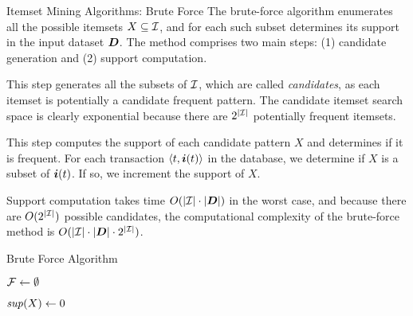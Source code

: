 \begin{frame}{Itemset Mining Algorithms: Brute Force}
\small
The brute-force
algorithm enumerates all the
possible itemsets $X \subseteq {\mathcal I}$, and for each such subset determines
its support in the input dataset ${\boldsymbol D}$. The method comprises two main
steps: (1) candidate generation and (2) support
computation.

This step generates all the subsets of
${\mathcal I}$, which are called {\em candidates}, as each itemset is
potentially a candidate frequent pattern. The candidate itemset search
space is clearly exponential because there are $2^{|{\mathcal I}|}$
potentially frequent itemsets.   


This step computes the support of each
candidate pattern $X$ and determines if it is frequent.
For each transaction
$\langle t, {{\boldsymbol i}}(t) \rangle$ in the database, we determine if $X$ is a
subset of ${{\boldsymbol i}}(t)$. If so, we increment the support of $X$.


Support computation takes time $O(|{\mathcal I}| \cdot | {\boldsymbol D} |)$ in the worst
case, and because there are $O(2^{|{\mathcal I}|})$ possible candidates,
the computational complexity of the brute-force method is
$O(|{\mathcal I}|\cdot|{\boldsymbol D}|\cdot2^{|{\mathcal I}|})$.

\end{frame}


\begin{frame}[fragile]{Brute Force Algorithm}
\begin{tightalgo}[H]{\textwidth-18pt}
\AlgorithmBF{}
${\mathcal F} \leftarrow \emptyset$ \;
\Return{$\cF$}
\end{tightalgo}
\begin{tightalgo}[H]{\textwidth-18pt}
\AlgorithmCS{}
$\mathit{sup}(X) \leftarrow 0$\;
\end{tightalgo}
\end{frame}

\ifdefined\wox \begin{frame} \titlepage \end{frame} \fi

